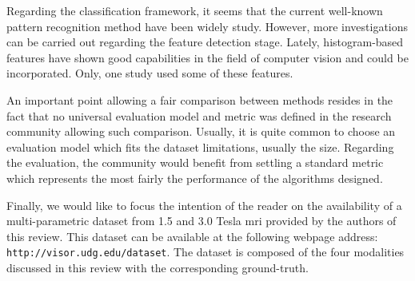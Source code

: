 Regarding the classification framework, it seems that the current well-known pattern recognition method have been widely study. However, more investigations can be carried out regarding the feature detection stage. Lately, histogram-based features have shown good capabilities in the field of computer vision and could be incorporated. Only, one study \cite{Liu2013} used some of these features.

An important point allowing a fair comparison between methods resides in the fact that no universal evaluation model and metric was defined in the research community allowing such comparison. Usually, it is quite common to choose an evaluation model which fits the dataset limitations, usually the size. Regarding the evaluation, the community would benefit from settling a standard metric which represents the most fairly the performance of the algorithms designed.

Finally, we would like to focus the intention of the reader on the availability of a multi-parametric dataset from 1.5 and 3.0 Tesla \ac{mri} provided by the authors of this review. This dataset can be available at the following webpage address: \texttt{http://visor.udg.edu/dataset}. The dataset is composed of the four modalities discussed in this review with the corresponding ground-truth.